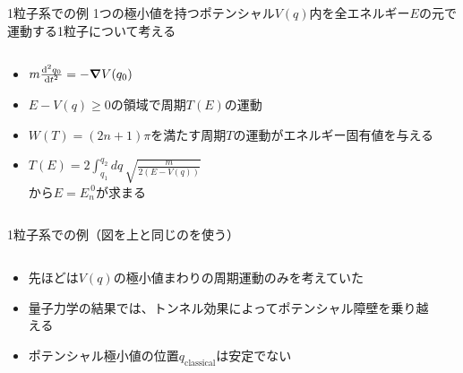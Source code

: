 \documentclass[14pt,aspectratio=169,xcolor=dvipsnames,table,dvipdfmx]{beamer}
\theoremstyle{definition}
\begin{document}
\begin{frame}{1粒子系での例}
  1つの極小値を持つポテンシャル$V(q)$内を全エネルギー$E$の元で運動する1粒子について考える
  \begin{columns}[t]
    \begin{column}{.5\textwidth}
      \begin{itemize}
        \item $m\dv[2]{q_0}{t} = -\grad V(q_0)$
        \item $E-V(q)\geq0$の領域で周期$T(E)$の運動
        \item $W(T)=(2n+1)\pi$を満たす周期$T$の運動がエネルギー固有値を与える
        \item $T(E)=2\int_{q_1}^{q_2}dq\,\sqrt{\frac{m}{2(E-V(q))}}$\\から$E=E_{n}^{~0}$が求まる
      \end{itemize}
    \end{column}
    \begin{column}{.5\textwidth}
    \end{column}
  \end{columns}
\end{frame}

\begin{frame}{1粒子系での例（図を上と同じのを使う）}
  \begin{columns}[t]
    \begin{column}{.5\textwidth}
      \begin{itemize}
        \item 先ほどは$V(q)$の極小値まわりの周期運動のみを考えていた
        \item 量子力学の結果では、トンネル効果によってポテンシャル障壁を乗り越える
        \item ポテンシャル極小値の位置$q_{\text{classical}}$は安定でない
      \end{itemize}
    \end{column}
    \begin{column}{.5\textwidth}
    \end{column}
  \end{columns}
\end{frame}
\end{document}

